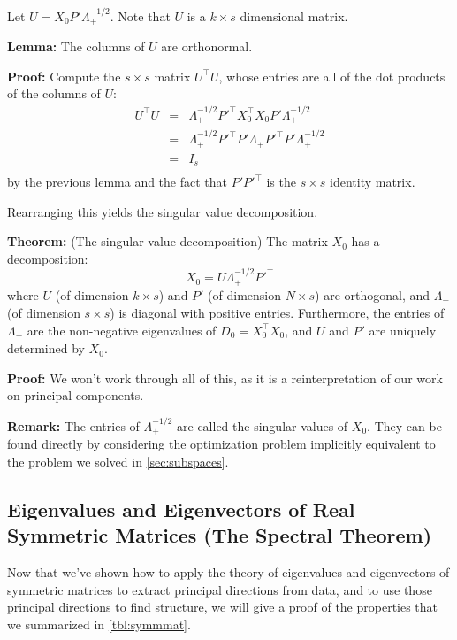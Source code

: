\documentclass[
]{article}
\begin{document}
Let \(U = X_{0}P'\Lambda_{+}^{-1/2}\). Note that \(U\) is a
\(k\times s\) dimensional matrix.

\textbf{Lemma:} The columns of \(U\) are orthonormal.

\textbf{Proof:} Compute the \(s\times s\) matrix \(U^{\intercal}U\),
whose entries are all of the dot products of the columns of \(U\): \[
\begin{aligned}
U^{\intercal}U &=& \Lambda_{+}^{-1/2}P'^{\intercal}X_{0}^{\intercal}X_{0}P'\Lambda_{+}^{-1/2} \\
&=& \Lambda_{+}^{-1/2}P'^{\intercal}P'\Lambda_{+}P'^{\intercal}P'\Lambda_{+}^{-1/2} \\
&=& I_{s} \\
\end{aligned}
\] by the previous lemma and the fact that \(P'P'^{\intercal}\) is the
\(s\times s\) identity matrix.

Rearranging this yields the singular value decomposition.

\textbf{Theorem:} (The singular value decomposition) The matrix
\(X_{0}\) has a decomposition: \[
X_{0} = U\Lambda_{+}^{-1/2}P'^{\intercal}
\] where \(U\) (of dimension \(k\times s\)) and \(P'\) (of dimension
\(N\times s\)) are orthogonal, and \(\Lambda_{+}\) (of dimension
\(s\times s\)) is diagonal with positive entries. Furthermore, the
entries of \(\Lambda_{+}\) are the non-negative eigenvalues of
\(D_{0}=X_{0}^{\intercal}X_{0}\), and \(U\) and \(P'\) are uniquely
determined by \(X_{0}\).

\textbf{Proof:} We won't work through all of this, as it is a
reinterpretation of our work on principal components.

\textbf{Remark:} The entries of \(\Lambda_{+}^{-1/2}\) are called the
singular values of \(X_{0}\). They can be found directly by considering
the optimization problem implicitly equivalent to the problem we solved
in \cref{sec:subspaces}.

\hypertarget{sec:spectraltheorem}{%
\subsection{Eigenvalues and Eigenvectors of Real Symmetric Matrices (The
Spectral Theorem)}\label{sec:spectraltheorem}}

Now that we've shown how to apply the theory of eigenvalues and
eigenvectors of symmetric matrices to extract principal directions from
data, and to use those principal directions to find structure, we will
give a proof of the properties that we summarized in \cref{tbl:symmmat}.
\end{document}
